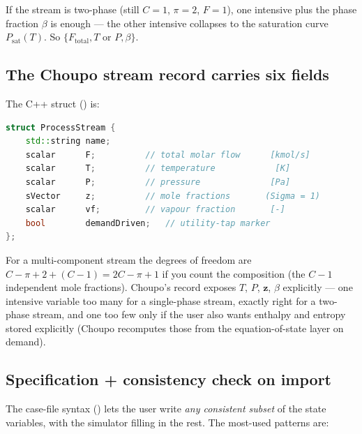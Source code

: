 \documentclass[11pt,a4paper]{article}
\newcommand{\zv}{\mathbf{z}}
\begin{document}
If the stream is two-phase (still $C=1$, $\pi=2$, $F = 1$), one
intensive plus the phase fraction $\beta$ is enough --- the other
intensive collapses to the saturation curve $P_{\mathrm{sat}}(T)$.
So $\{F_{\mathrm{total}}, T \text{ or } P, \beta\}$.

\subsection{The Choupo stream record carries six fields}

The C++ struct () is:

\begin{lstlisting}[language=c++]
struct ProcessStream {
    std::string name;
    scalar      F;          // total molar flow      [kmol/s]
    scalar      T;          // temperature            [K]
    scalar      P;          // pressure              [Pa]
    sVector     z;          // mole fractions       (Sigma = 1)
    scalar      vf;         // vapour fraction       [-]
    bool        demandDriven;   // utility-tap marker
};
\end{lstlisting}

For a multi-component stream the degrees of freedom are
$C - \pi + 2 + (C-1) = 2 C - \pi + 1$ if you count the
composition (the $C-1$ independent mole fractions).  Choupo's
record exposes $T$, $P$, $\zv$, $\beta$ explicitly --- one
intensive variable too many for a single-phase stream, exactly
right for a two-phase stream, and one too few only if the user
also wants enthalpy and entropy stored explicitly (Choupo
recomputes those from the equation-of-state layer on demand).

\subsection{Specification + consistency check on import}

The case-file syntax () lets the user
write \emph{any consistent subset} of the state variables, with
the simulator filling in the rest.  The most-used patterns are:
\end{document}
